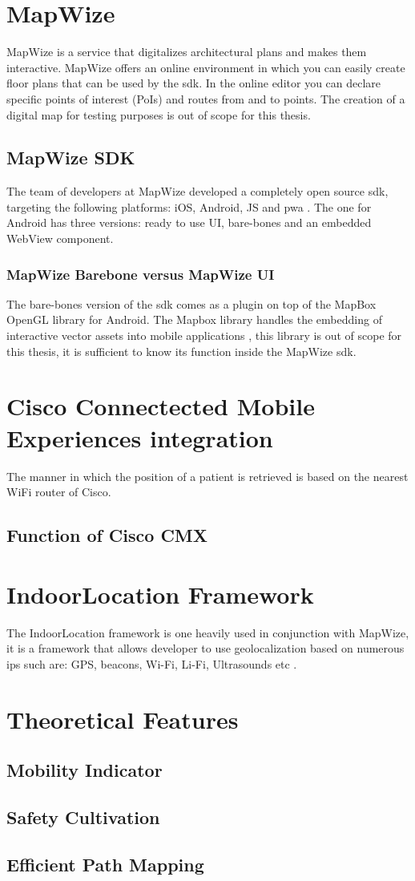 \section{MapWize}
MapWize is a service that digitalizes architectural plans and makes them interactive. MapWize offers an online environment in which you can easily create floor plans that can be used by the \acrshort{sdk}. In the online editor you can declare specific points of interest (PoIs) and routes from and to points. The creation of a digital map for testing purposes is out of scope for this thesis.
\subsection{MapWize SDK}
The team of developers at MapWize developed a completely open source \acrshort{sdk}, targeting the following platforms: iOS, Android, JS and \acrfull{pwa} \cite{MapWize.io2019a}. The one for Android has three versions: ready to use UI, bare-bones and an embedded WebView component.
\subsubsection{MapWize Barebone versus MapWize UI}
The bare-bones version of the \acrshort{sdk} comes as a plugin on top of the MapBox OpenGL library for Android. The Mapbox library handles the embedding of interactive vector assets into mobile applications \cite{Mabox2019}, this library is out of scope for this thesis, it is sufficient to know its function inside the MapWize \acrshort{sdk}. 
\section{Cisco Connectected Mobile Experiences integration}
The manner in which the position of a patient is retrieved is based on the nearest WiFi router of Cisco.
\subsection{Function of Cisco CMX}
\section{IndoorLocation Framework}
The IndoorLocation framework is one heavily used in conjunction with MapWize, it is a framework that allows developer to use geolocalization based on numerous \acrfull{ips} such are: GPS, beacons, Wi-Fi, Li-Fi, Ultrasounds etc \cite{IndoorLocation.io2019}.
\section{Theoretical Features}
\subsection{Mobility Indicator}
\subsection{Safety Cultivation}
\subsection{Efficient Path Mapping}


